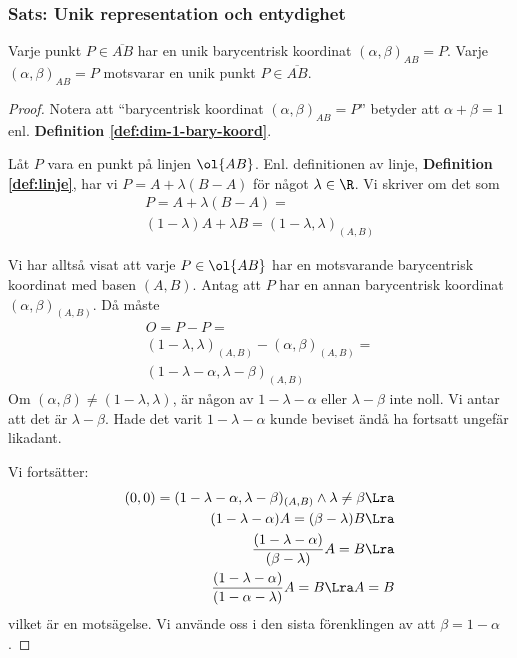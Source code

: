 \subsubsection{Sats: Unik representation och entydighet}
\begin{theorem}
\label{thm:dim-1-unik}
Varje punkt $P \in \overline{AB}$ har en unik 
barycentrisk koordinat 
$(\alpha, \beta)_{AB} = P$.
Varje $(\alpha,\beta)_{AB} = P$ motsvarar en unik punkt $P \in \overline{AB}$.
\end{theorem}
\begin{proof}
    Notera att ``barycentrisk koordinat $(\alpha, \beta)_{AB} = P$'' betyder att $\alpha + \beta = 1$
    enl. \textbf{Definition \ref{def:dim-1-bary-koord}}.

    Låt $P$ vara en punkt på linjen $\ol{AB}$. Enl. definitionen av linje, \textbf{Definition \ref{def:linje}},
    har vi $P = A + \lambda(B-A)$ för något $\lambda \in \R$.
    Vi skriver om det som
    \begin{eqnarray*}
    P = A + \lambda(B-A) = \\
    (1-\lambda)A + \lambda B = (1-\lambda, \lambda)_{(A, B)}
    \end{eqnarray*}

    Vi har alltså visat att varje $P\in \ol{AB}$ har en motsvarande barycentrisk koordinat med basen $(A, B)$.
    Antag att $P$ har en annan barycentrisk koordinat $(\alpha, \beta)_{(A, B)}$.
    Då måste 
    \begin{eqnarray*}
    O = P - P = \\
    (1-\lambda, \lambda)_{(A, B)} - (\alpha, \beta)_{(A, B)} = \\
    (1-\lambda - \alpha, \lambda - \beta)_{(A, B)} 
    \end{eqnarray*}
    Om $(\alpha, \beta) \neq (1-\lambda, \lambda)$, är någon av $1-\lambda - \alpha$ eller
    $\lambda - \beta$ inte noll. Vi antar att det är $\lambda - \beta$. Hade det varit 
    $1-\lambda - \alpha$ kunde beviset ändå ha fortsatt ungefär likadant.

    Vi fortsätter:
    \begin{eqnarray*}
    (0, 0) = (1-\lambda - \alpha, \lambda - \beta)_{(A, B)} \wedge \lambda \neq \beta \Lra \\
    (1-\lambda - \alpha) A = (\beta - \lambda) B \Lra \\
    \frac{(1-\lambda - \alpha)}{(\beta - \lambda)} A = B \Lra\\
    \frac{(1-\lambda - \alpha)}{(1 - \alpha - \lambda )} A = B \Lra A = B
    \end{eqnarray*}
    vilket är en motsägelse. Vi använde oss i den sista förenklingen av att $\beta = 1-\alpha$.


\end{proof}
